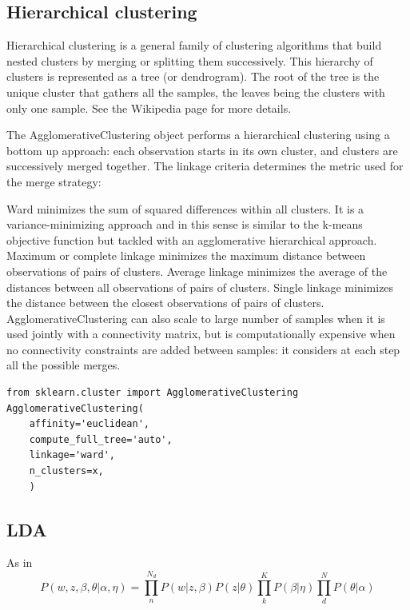 \subsection{Hierarchical clustering}

Hierarchical clustering is a general family of clustering algorithms that build nested clusters by merging or splitting them successively. This hierarchy of clusters is represented as a tree (or dendrogram). The root of the tree is the unique cluster that gathers all the samples, the leaves being the clusters with only one sample. See the Wikipedia page for more details.

The AgglomerativeClustering object performs a hierarchical clustering using a bottom up approach: each observation starts in its own cluster, and clusters are successively merged together. The linkage criteria determines the metric used for the merge strategy:

Ward minimizes the sum of squared differences within all clusters. It is a variance-minimizing approach and in this sense is similar to the k-means objective function but tackled with an agglomerative hierarchical approach.
Maximum or complete linkage minimizes the maximum distance between observations of pairs of clusters.
Average linkage minimizes the average of the distances between all observations of pairs of clusters.
Single linkage minimizes the distance between the closest observations of pairs of clusters.
AgglomerativeClustering can also scale to large number of samples when it is used jointly with a connectivity matrix, but is computationally expensive when no connectivity constraints are added between samples: it considers at each step all the possible merges.
\begin{lstlisting}[style=mypython]
from sklearn.cluster import AgglomerativeClustering
AgglomerativeClustering(
    affinity='euclidean',
    compute_full_tree='auto',
    linkage='ward',
    n_clusters=x,
    )
\end{lstlisting}

\subsection{LDA}\label{sec:lda}
As in ~\cite{Zhou2016}
\begin{equation}\label{eq:lda}
P(w, z,\beta, \theta| \alpha, \eta)=\prod_n^{N_d} P(w|z,\beta)P(z|\theta)\prod_k^KP(\beta|\eta)\prod_d^N P(\theta | \alpha)
\end{equation}

